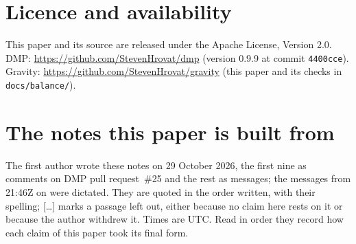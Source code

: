 \documentclass[11pt,a4paper]{article}
\theoremstyle{definition}
\begin{document}
\section*{Licence and availability}
This paper and its source are released under the Apache License, Version 2.0. DMP: \url{https://github.com/StevenHrovat/dmp} (version 0.9.9
at commit \texttt{4400cce}). Gravity: \url{https://github.com/StevenHrovat/gravity} (this paper and its checks in \texttt{docs/balance/}).

\appendix

\section{The notes this paper is built from}\label{app:notes}

The first author wrote these notes on 29 October 2026, the first nine as comments on DMP pull request~\#25 and the rest as messages; the
messages from 21:46Z on were dictated. They are quoted in the order written, with their spelling; [\dots] marks a passage left out, either
because no claim here rests on it or because the author withdrew it. Times are UTC. Read in order they record how each claim of this paper
took its final form.
\end{document}
